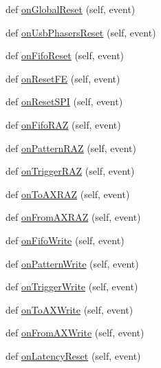 \begin{DoxyCompactItemize}
\item 
def \hyperlink{classProto40MHz__v1_1_1Proto40MHz__v1_a3396648f1e18f32dfc0e2f9edb38c723}{on\+Global\+Reset} (self, event)
\item 
def \hyperlink{classProto40MHz__v1_1_1Proto40MHz__v1_af3de374ffd7881b77c2f8c8001a10077}{on\+Usb\+Phasers\+Reset} (self, event)
\item 
def \hyperlink{classProto40MHz__v1_1_1Proto40MHz__v1_ab13eebd15de4b16c9abf12d07dbda156}{on\+Fifo\+Reset} (self, event)
\item 
def \hyperlink{classProto40MHz__v1_1_1Proto40MHz__v1_a9b79ac2b7e3f3d0b3b11da1d0366656b}{on\+Reset\+FE} (self, event)
\item 
def \hyperlink{classProto40MHz__v1_1_1Proto40MHz__v1_a64103f436e81b9e0b08d94b22fd4a088}{on\+Reset\+S\+PI} (self, event)
\item 
def \hyperlink{classProto40MHz__v1_1_1Proto40MHz__v1_af298324a50fcbaab3114aa2b9cc52b81}{on\+Fifo\+R\+AZ} (self, event)
\item 
def \hyperlink{classProto40MHz__v1_1_1Proto40MHz__v1_a4ab762dab8eaef531e74cb43c8e3b399}{on\+Pattern\+R\+AZ} (self, event)
\item 
def \hyperlink{classProto40MHz__v1_1_1Proto40MHz__v1_a6eaf9957a2db9ea41e3cb80625fbd8c9}{on\+Trigger\+R\+AZ} (self, event)
\item 
def \hyperlink{classProto40MHz__v1_1_1Proto40MHz__v1_a9a9f8eae643623b9aae3239fc204a9d1}{on\+To\+A\+X\+R\+AZ} (self, event)
\item 
def \hyperlink{classProto40MHz__v1_1_1Proto40MHz__v1_aee2e5a6ae16a099c14d734eaaa119979}{on\+From\+A\+X\+R\+AZ} (self, event)
\item 
def \hyperlink{classProto40MHz__v1_1_1Proto40MHz__v1_ac3a292f2caf8585e44dd45ce99c6cbf7}{on\+Fifo\+Write} (self, event)
\item 
def \hyperlink{classProto40MHz__v1_1_1Proto40MHz__v1_a1e9aa581b003b51a6f9b532d69734202}{on\+Pattern\+Write} (self, event)
\item 
def \hyperlink{classProto40MHz__v1_1_1Proto40MHz__v1_a6d03147c7dc0b36d7e7b3405c625ce1c}{on\+Trigger\+Write} (self, event)
\item 
def \hyperlink{classProto40MHz__v1_1_1Proto40MHz__v1_a0111c0c34c35554f5775a2ebfd651d2d}{on\+To\+A\+X\+Write} (self, event)
\item 
def \hyperlink{classProto40MHz__v1_1_1Proto40MHz__v1_ac8f631c7bc3944eadb1c8fce58f21a6d}{on\+From\+A\+X\+Write} (self, event)
\item 
def \hyperlink{classProto40MHz__v1_1_1Proto40MHz__v1_a1558f7e9c28374df38db7229076f621c}{on\+Latency\+Reset} (self, event)

\end{DoxyCompactItemize}
